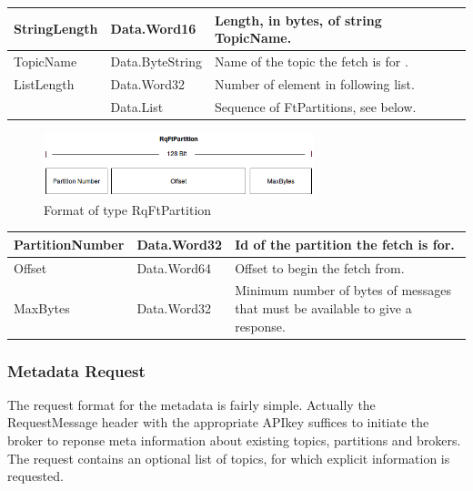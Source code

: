 \begin{table}[H]
\centering
\begin{tabular}{ l  l  p{10cm} }
\hline
StringLength      & Data.Word16     & Length, in bytes, of string TopicName.              \\ \hline
TopicName         & Data.ByteString & Name of the topic the fetch is for . \\ \hline
ListLength        & Data.Word32     & Number of element in following list.                \\ \hline
[FtPartition]     & Data.List       & Sequence of FtPartitions, see below.                \\ \hline
\end{tabular}
\end{table}

\begin{figure}[H]
    \centering
    \includegraphics[width=0.7\textwidth]{images/impl-prot-types-ftPartition.png}
    \caption{Format of type RqFtPartition }
    \label{fig:impl-prot-types-ftPartition}
\end{figure}

\begin{table}[H]
\centering
\begin{tabular}{ l  l  p{10cm} }
\hline
PartitionNumber & Data.Word32 & Id of the partition the fetch is for.                                          \\ \hline
Offset          & Data.Word64 & Offset to begin the fetch from.                                                \\ \hline
MaxBytes        & Data.Word32 & Minimum number of bytes of messages that must be available to give a response. \\ \hline
\end{tabular}
\end{table}

\subsubsection{Metadata Request}
The request format for the metadata is fairly simple. Actually the
RequestMessage header with the appropriate APIkey suffices to initiate the
broker to reponse meta information about existing topics, partitions and
brokers. The request contains an optional list of topics, for which explicit
information is requested.

